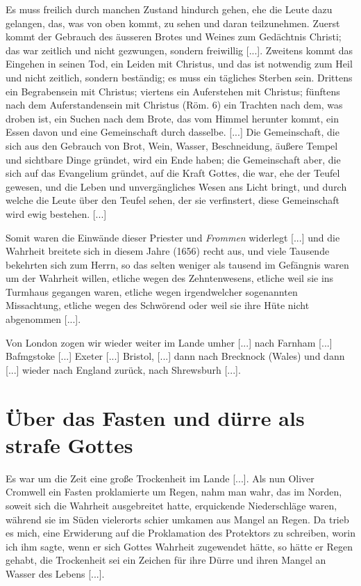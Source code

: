 {    Es muss freilich durch manchen Zustand hindurch gehen, ehe
    die Leute dazu gelangen, das, was von oben kommt, zu sehen
    und daran teilzunehmen. Zuerst kommt der Gebrauch des äusseren
    Brotes und Weines zum Gedächtnis Christi; das war zeitlich und
    nicht gezwungen, sondern freiwillig [...]. Zweitens kommt das
    Eingehen in seinen Tod, ein Leiden mit Christus, und das ist
    notwendig zum Heil und nicht zeitlich, sondern beständig; es muss
    ein tägliches Sterben sein. Drittens ein Begrabensein mit Christus;
    viertens ein Auferstehen mit Christus; fünftens nach 
    dem Auferstandensein mit Christus 
    (Röm. 6) ein Trachten nach dem, was
    droben ist, ein Suchen nach dem Brote, das vom Himmel 
    herunter kommt, ein Essen davon und eine Gemeinschaft durch 
    dasselbe. [...] Die Gemeinschaft, die sich aus den Gebrauch von
    Brot, Wein, Wasser, Beschneidung, äußere Tempel und sichtbare
    Dinge gründet, wird ein Ende haben; die Gemeinschaft aber, die
    sich auf das Evangelium gründet, auf die Kraft Gottes, die war,
    ehe der Teufel gewesen, und die Leben und 
    unvergängliches Wesen
    ans Licht bringt, und durch welche die Leute über den Teufel
    sehen, der sie verfinstert, diese Gemeinschaft wird ewig 
    bestehen. [...]
}


Somit waren die Einwände dieser Priester und \textit{Frommen}
widerlegt [...] und die Wahrheit breitete sich in diesem Jahre
(1656) recht aus, und viele Tausende bekehrten sich 
zum Herrn,
so das selten weniger als tausend im Gefängnis waren um der
Wahrheit willen, etliche wegen des 
Zehntenwesens, etliche
weil sie ins Turmhaus gegangen waren, etliche wegen 
irgendwelcher sogenannten Missachtung, etliche wegen 
des Schwörend oder weil sie ihre 
Hüte nicht abgenommen [...].


Von London zogen wir wieder weiter im Lande umher [...]
nach Farnham [...] Bafmgstoke [...] Exeter [...] Bristol, [...] dann
nach Brecknock (Wales) und dann [...] wieder nach England 
zurück, nach Shrewsburh [...].

\section{Über das Fasten und dürre als strafe Gottes}

Es war um die Zeit eine große Trockenheit im Lande [...].
Als nun Oliver Cromwell ein 
Fasten proklamierte um Regen,
nahm man wahr, das im Norden, soweit sich die Wahrheit 
ausgebreitet hatte, erquickende Niederschläge waren, während sie im
Süden vielerorts schier umkamen aus Mangel an Regen. Da
trieb es mich, eine Erwiderung auf die Proklamation des 
Protektors zu schreiben, worin ich ihm sagte, wenn er sich Gottes
Wahrheit zugewendet hätte, so hätte er Regen gehabt, die 
Trockenheit sei ein Zeichen für ihre Dürre und ihren Mangel an Wasser
des Lebens [...].


